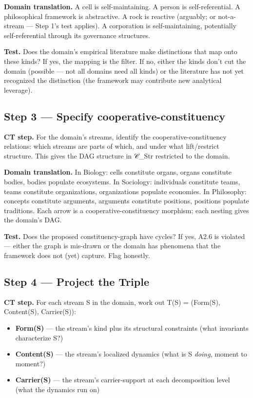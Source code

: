 \documentclass[11pt, openany]{book}
\begin{document}
\textbf{Domain translation.} A cell is self-maintaining. A person is self-referential. A philosophical framework is abstractive. A rock is reactive (arguably; or not-a-stream --- Step 1's test applies). A corporation is self-maintaining, potentially self-referential through its governance structures.

\textbf{Test.} Does the domain's empirical literature make distinctions that map onto these kinds? If yes, the mapping is the filter. If no, either the kinds don't cut the domain (possible --- not all domains need all kinds) or the literature has not yet recognized the distinction (the framework may contribute new analytical leverage).

\subsection{Step 3 --- Specify cooperative-constituency}

\textbf{CT step.} For the domain's streams, identify the cooperative-constituency relations: which streams are parts of which, and under what lift/restrict structure. This gives the DAG structure in 𝒞\_\allowbreak{}Str restricted to the domain.

\textbf{Domain translation.} In Biology: cells constitute organs, organs constitute bodies, bodies populate ecosystems. In Sociology: individuals constitute teams, teams constitute organizations, organizations populate economies. In Philosophy: concepts constitute arguments, arguments constitute positions, positions populate traditions. Each arrow is a cooperative-constituency morphism; each nesting gives the domain's DAG.

\textbf{Test.} Does the proposed constituency-graph have cycles? If yes, A2.6 is violated --- either the graph is mis-drawn or the domain has phenomena that the framework does not (yet) capture. Flag honestly.

\subsection{Step 4 --- Project the Triple}

\textbf{CT step.} For each stream S in the domain, work out T(S) = (Form(S), Content(S), Carrier(S)):

\begin{itemize}
\item \textbf{Form(S)} --- the stream's kind plus its structural constraints (what invariants characterize S?)
\item \textbf{Content(S)} --- the stream's localized dynamics (what is S \textit{doing}, moment to moment?)
\item \textbf{Carrier(S)} --- the stream's carrier-support at each decomposition level (what the dynamics run on)
\end{itemize}
\end{document}
